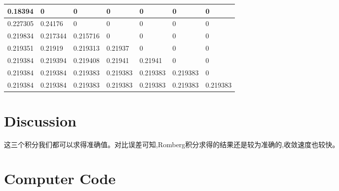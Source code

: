 \documentclass{article}
\begin{document}
\begin{table}[H]
	\centering
	\begin{tabular}{|l|l|l|l|l|l|l|}
		\hline
		0.18394 & 0 & 0 & 0 & 0 & 0 & 0 \\ \hline
		0.227305 & 0.24176 & 0 & 0 & 0 & 0 & 0 \\ \hline
		0.219834 & 0.217344 & 0.215716 & 0 & 0 & 0 & 0 \\ \hline
		0.219351 & 0.21919 & 0.219313 & 0.21937 & 0 & 0 & 0 \\ \hline
		0.219384 & 0.219394 & 0.219408 & 0.21941 & 0.21941 & 0 & 0 \\ \hline
		0.219384 & 0.219384 & 0.219383 & 0.219383 & 0.219383 & 0.219383 & 0 \\ \hline
		0.219384 & 0.219384 & 0.219383 & 0.219383 & 0.219383 & 0.219383 & 0.219383 \\ \hline
	\end{tabular}
\end{table}


	\section{Discussion}
	
	这三个积分我们都可以求得准确值。对比误差可知,Romberg积分求得的结果还是较为准确的,收敛速度也较快。
	

	
	\section{Computer Code}
	
	
\end{document}
